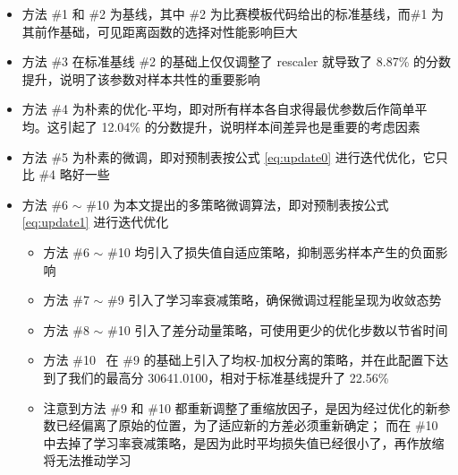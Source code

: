 \documentclass[withoutpreface,bwprint]{cumcmthesis}
\begin{document}
\begin{itemize}
\item 方法 \#1 和 \#2 为基线，其中 \#2 为比赛模板代码给出的标准基线，而\#1 为其前作基础，可见距离函数的选择对性能影响巨大
\item 方法 \#3 在标准基线 \#2 的基础上仅仅调整了 rescaler 就导致了 8.87\% 的分数提升，说明了该参数对样本共性的重要影响
\item 方法 \#4 为朴素的优化-平均，即对所有样本各自求得最优参数后作简单平均。这引起了 12.04\% 的分数提升，说明样本间差异也是重要的考虑因素
\item 方法 \#5 为朴素的微调，即对预制表按公式 \ref{eq:update0} 进行迭代优化，它只比 \#4 略好一些
\item 方法 \#6 $ \sim $ \#10 为本文提出的多策略微调算法，即对预制表按公式 \ref{eq:update1} 进行迭代优化
\begin{itemize}
  \item 方法 \#6 $ \sim $ \#10 均引入了损失值自适应策略，抑制恶劣样本产生的负面影响
  \item 方法 \#7 $ \sim $ \#9 引入了学习率衰减策略，确保微调过程能呈现为收敛态势
  \item 方法 \#8 $ \sim $ \#10 引入了差分动量策略，可使用更少的优化步数以节省时间
  \item 方法 \#10 \ 在 \#9 的基础上引入了均权-加权分离的策略，并在此配置下达到了我们的最高分 30641.0100，相对于标准基线提升了 22.56\%
  \item 注意到方法 \#9 和 \#10 都重新调整了重缩放因子，是因为经过优化的新参数已经偏离了原始的位置，为了适应新的方差必须重新确定；
            而在 \#10 中去掉了学习率衰减策略，是因为此时平均损失值已经很小了，再作放缩将无法推动学习
\end{itemize}
\end{itemize}
\end{document}
